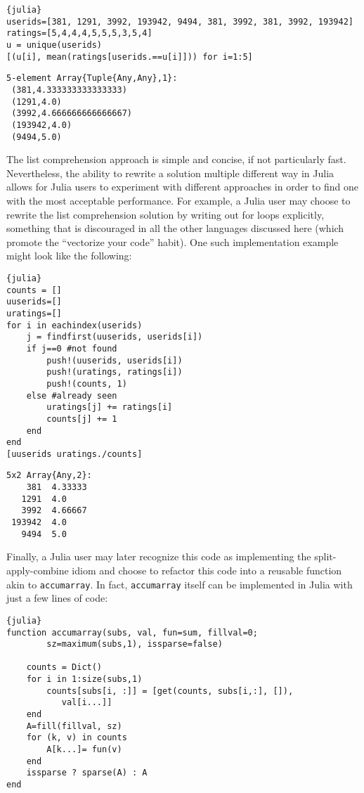 \documentclass[11pt]{asaproc}
\begin{document}
\begin{lstlisting}{julia}
userids=[381, 1291, 3992, 193942, 9494, 381, 3992, 381, 3992, 193942]
ratings=[5,4,4,4,5,5,5,3,5,4]
u = unique(userids)
[(u[i], mean(ratings[userids.==u[i]])) for i=1:5]
\end{lstlisting}
\begin{verbatim}
5-element Array{Tuple{Any,Any},1}:
 (381,4.333333333333333)
 (1291,4.0)
 (3992,4.666666666666667)
 (193942,4.0)
 (9494,5.0)
\end{verbatim}

The list comprehension approach is simple and concise, if not particularly
fast. Nevertheless, the ability to rewrite a solution multiple different way in
Julia allows for Julia users to experiment with different approaches in order
to find one with the most acceptable performance. For example, a Julia user may
choose to rewrite the list comprehension solution by writing out for loops
explicitly, something that is discouraged in all the other languages discussed
here (which promote the ``vectorize your code'' habit). One such implementation
example might look like the following:

\begin{lstlisting}{julia}
counts = []
uuserids=[]
uratings=[]
for i in eachindex(userids)
    j = findfirst(uuserids, userids[i])
    if j==0 #not found
        push!(uuserids, userids[i])
        push!(uratings, ratings[i])
        push!(counts, 1)
    else #already seen
        uratings[j] += ratings[i]
        counts[j] += 1
    end
end
[uuserids uratings./counts]
\end{lstlisting}
\begin{verbatim}
5x2 Array{Any,2}:
    381  4.33333
   1291  4.0
   3992  4.66667
 193942  4.0
   9494  5.0
\end{verbatim}

Finally, a Julia user may later recognize this code as implementing the
split-apply-combine idiom and choose to refactor this code into a reusable
function akin to \lstinline|accumarray|. In fact, \lstinline|accumarray| itself
can be implemented in Julia with just a few lines of code:

\begin{lstlisting}{julia}
function accumarray(subs, val, fun=sum, fillval=0;
        sz=maximum(subs,1), issparse=false)

    counts = Dict()
    for i in 1:size(subs,1)
        counts[subs[i, :]] = [get(counts, subs[i,:], []),
           val[i...]]
    end
    A=fill(fillval, sz)
    for (k, v) in counts
        A[k...]= fun(v)
    end
    issparse ? sparse(A) : A
end
\end{lstlisting}
\end{document}
